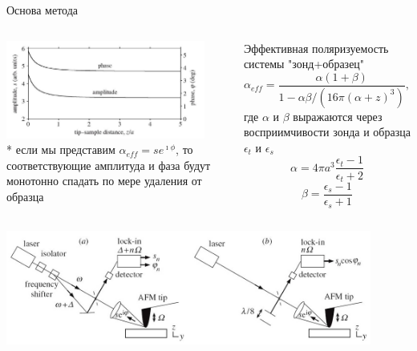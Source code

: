 \documentclass[9pt, compress, xcolor=table]{beamer}
\begin{document}
\begin{frame}{Основа метода}
\begin{columns}[c]
\column{6.5cm}
\begin{center}
\includegraphics[width=0.9\textwidth]{nfm6}
\\* если мы представим $\alpha_{eff} = s e^{\imath \phi}$, то соответствующие амплитуда и фаза будут монотонно спадать по мере удаления от образца
\end{center}

\column{6.5cm}
\begin{center}
Эффективная поляризуемость системы "зонд+образец"
\begin{equation*}
\alpha_{eff}=\frac{\alpha(1+\beta)}{1-\alpha\beta/(16\pi(\alpha+z)^3)},
\end{equation*}
где $\alpha$ и $\beta$ выражаются через восприимчивости зонда и образца $\epsilon_t$  и $\epsilon_s$
\begin{equation*}
\alpha=4\pi a^3\frac{\epsilon_t-1}{\epsilon_t+2}
\end{equation*}
\begin{equation*}
\beta=\frac{\epsilon_s-1}{\epsilon_s+1}
\end{equation*}
\end{center}
\end{columns}

\begin{center}
\includegraphics[width=0.9\textwidth]{nfm8}
\end{center}

\end{frame}
\end{document}
